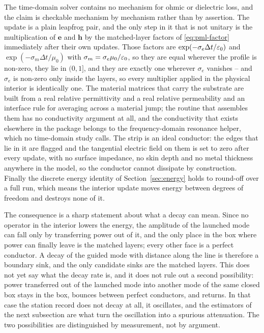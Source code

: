 The time-domain solver contains no mechanism for ohmic or dielectric loss, and the claim is checkable
mechanism by mechanism rather than by assertion. The update is a plain leapfrog pair, and the only step in it
that is not unitary is the multiplication of $\mathbf{e}$ and $\mathbf{h}$ by the matched-layer factors of
\eqref{eq:pml-factor} immediately after their own updates. Those factors are $\exp(-\sigma_e\Delta t/\varepsilon_0)$
and $\exp(-\sigma_m\Delta t/\mu_0)$ with $\sigma_m = \sigma_e\mu_0/\varepsilon_0$, so they are equal wherever the
profile is non-zero, they lie in $(0,1]$, and they are exactly one wherever $\sigma_e$ vanishes -- and
$\sigma_e$ is non-zero only inside the layers, so every multiplier applied in the physical interior is
identically one. The material matrices that carry the substrate are built from a real relative permittivity
and a real relative permeability and an interface rule for averaging across a material jump; the routine that
assembles them has no conductivity argument at all, and the conductivity that exists elsewhere in the package
belongs to the frequency-domain resonance helper, which no time-domain study calls. The strip is an ideal
conductor: the edges that lie in it are flagged and the tangential electric field on them is set to zero after
every update, with no surface impedance, no skin depth and no metal thickness anywhere in the model, so the
conductor cannot dissipate by construction. Finally the discrete energy identity of
Section~\ref{sec:energy} holds to round-off over a full run, which means the interior update moves energy
between degrees of freedom and destroys none of it.

The consequence is a sharp statement about what a decay can mean. Since no operator in the interior lowers the
energy, the amplitude of the launched mode can fall only by transferring power out of it, and the only place in
the box where power can finally leave is the matched layers; every other face is a perfect conductor. A decay
of the guided mode with distance along the line is therefore a boundary sink, and the only candidate sinks are
the matched layers. This does not yet say what the decay rate is, and it does not rule out a second
possibility: power transferred out of the launched mode into another mode of the same closed box stays in the
box, bounces between perfect conductors, and returns. In that case the station record does not decay at all,
it oscillates, and the estimators of the next subsection are what turn the oscillation into a spurious
attenuation. The two possibilities are distinguished by measurement, not by argument.

